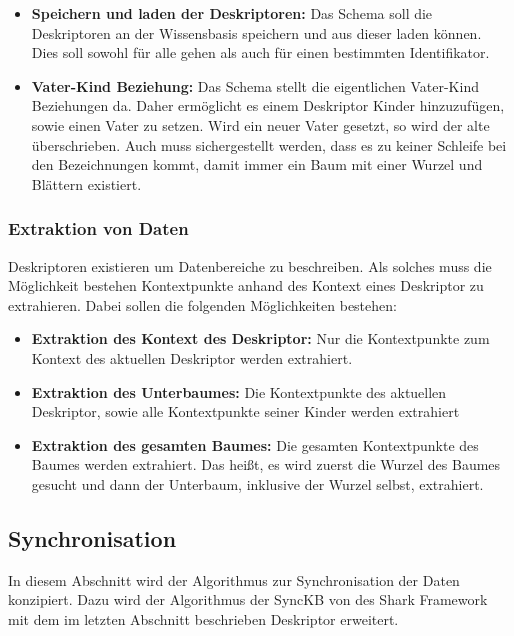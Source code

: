 \documentclass[a4paper]{article}
\begin{document}
	\newpage
	\begin{itemize}
		\item \textbf{Speichern und laden der Deskriptoren:} Das Schema soll die
		 Deskriptoren an der Wissensbasis speichern und aus dieser laden können.
		 Dies soll sowohl für alle gehen als auch für einen bestimmten
		 Identifikator.
		\item \textbf{Vater-Kind Beziehung:} Das Schema stellt die eigentlichen
		Vater-Kind Beziehungen da. Daher ermöglicht es einem Deskriptor Kinder
		hinzuzufügen, sowie einen Vater zu setzen. Wird ein neuer Vater gesetzt,
		so wird der alte überschrieben. Auch muss sichergestellt werden, dass
		es zu keiner Schleife bei den Bezeichnungen kommt, damit immer ein Baum
		mit einer Wurzel und Blättern existiert.
	\end{itemize}
	
	\subsubsection{Extraktion von Daten}
	\label{sec:extraction}
	
	Deskriptoren existieren um Datenbereiche zu beschreiben. Als solches 
	muss die Möglichkeit bestehen Kontextpunkte anhand des Kontext eines Deskriptor
	zu extrahieren. Dabei sollen die folgenden Möglichkeiten bestehen:
	
	\begin{itemize}
		\item \textbf{Extraktion des Kontext des Deskriptor:} Nur die Kontextpunkte
		zum Kontext des aktuellen Deskriptor werden extrahiert.
		\item \textbf{Extraktion des Unterbaumes:} Die Kontextpunkte des aktuellen
		 Deskriptor, sowie alle Kontextpunkte seiner Kinder werden extrahiert
		\item \textbf{Extraktion des gesamten Baumes:} Die gesamten Kontextpunkte
		des Baumes werden extrahiert. Das heißt, es wird zuerst die Wurzel des
		Baumes gesucht und dann der Unterbaum, inklusive der Wurzel selbst,
		extrahiert.
	\end{itemize}
	
	\subsection{Synchronisation}
	
	In diesem Abschnitt wird der Algorithmus zur Synchronisation der Daten
	konzipiert. Dazu wird der Algorithmus der SyncKB von des Shark Framework 
	mit dem im letzten Abschnitt beschrieben Deskriptor erweitert.
	
\end{document}

